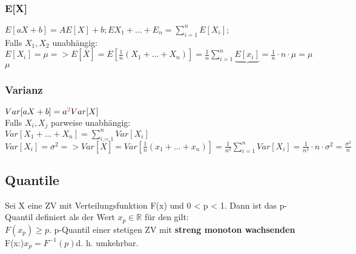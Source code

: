 \subsubsection{E[X]}
$E[aX + b] = AE[X]+b;E{X_{1}+ ...+ E_{n}} = \sum_{i=1}^{n} E[X_{i}];$\\
Falls $X_{1}, X_{2}$ unabhängig:\\
$E[X_{i}] = \mu => E[\overline{X}] = E[\frac{1}{n}(X_{1} + ...+ X_{n})] =  \frac{1}{n}\sum_{i=1}^{n} \underbrace{E[x_{i}]} = \frac{1}{n}\cdot n \cdot \mu = \mu$\\
$\mu$\\
\subsubsection{Varianz}
$Var[aX + b] = a\textcolor{red}{^2}Var[X]$\\
Falls $X_{i}, X_{j}$ parweise unabhängig:\\
$Var[X_{1} + ... + X_{n}] = \sum_{i=1}^{n} Var[X_{i}]$\\
$Var[X_{i}] = \sigma^2 => Var[\overline{X}] = Var[\frac{1}{n}(x_{1} + ... + x_{n})] = \frac{1}{n^2} \sum_{i=1}^{n} Var[X_{i}] = \frac{1}{n^2} \cdot n \cdot \sigma^2 = \frac{\sigma^2}{n}$
\subsection{Quantile}
Sei X eine ZV mit Verteilungsfunktion F(x) und 0 < p < 1. Dann ist das p-Quantil definiert als der Wert $x_{p} \in \mathbb{R}$ für den gilt:\\
$F(x_{p}) \ge p.$ p-Quantil einer stetigen ZV mit \textbf{streng monoton wachsenden} F(x:)$x_{p} = F^{-1}(p)$d. h. umkehrbar.
